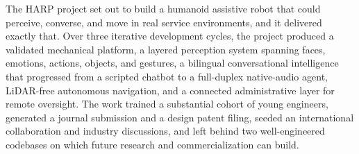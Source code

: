 \documentclass[11pt,a4paper]{article}
\begin{document}
The HARP project set out to build a humanoid assistive robot that could perceive, converse, and move in real service environments, and it delivered exactly that. Over three iterative development cycles, the project produced a validated mechanical platform, a layered perception system spanning faces, emotions, actions, objects, and gestures, a bilingual conversational intelligence that progressed from a scripted chatbot to a full-duplex native-audio agent, LiDAR-free autonomous navigation, and a connected administrative layer for remote oversight. The work trained a substantial cohort of young engineers, generated a journal submission and a design patent filing, seeded an international collaboration and industry discussions, and left behind two well-engineered codebases on which future research and commercialization can build.
\end{document}
